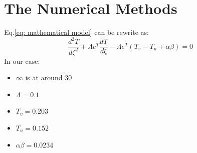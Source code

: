 \documentclass[11pt, a4paper]{article}
\begin{document}
\section{The Numerical Methods}
Eq.\ref{eq: mathematical model} can be rewrite as:
\begin{equation*}
    \displaystyle\frac{d^2T}{d\zeta^2}+\Lambda e^T\frac{dT}{d\zeta}-\Lambda e^T\left(T_v-T_u+\alpha\beta\right)=0
    \label{eq: the ode}
\end{equation*}
In our case:
\begin{itemize}
    \item $\infty$ is at around $30$
    \item $\Lambda=0.1$
    \item $T_v=0.203$
    \item $T_u=0.152$
    \item $\alpha\beta=0.0234$
\end{itemize}
\end{document}
